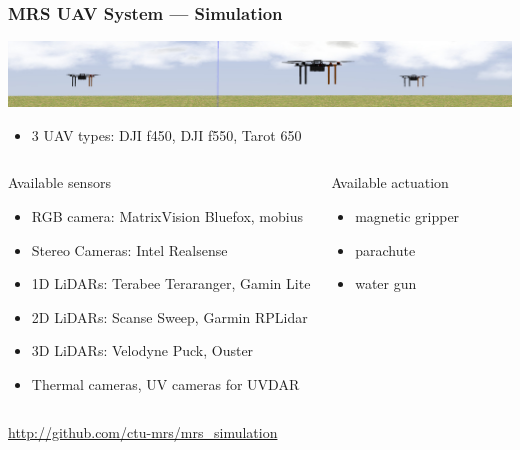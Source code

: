 \documentclass[aspectratio=1610]{beamer}
\begin{document}


  \begin{frame}
    \frametitle{MRS UAV System --- Simulation}

    \vspace{-0.33em}

    \includegraphics[width=1.0\textwidth]{./fig/thumbnail_simulation.jpg}

    \vspace{-0.3em}

    \begin{itemize}
      \item 3 UAV types: DJI f450, DJI f550, Tarot 650
    \end{itemize}

    \begin{columns}[c]


      \begin{block}{Available sensors}
        \begin{itemize}
          \item RGB camera: MatrixVision Bluefox, mobius
          \item Stereo Cameras: Intel Realsense
          \item 1D LiDARs: Terabee Teraranger, Gamin Lite
          \item 2D LiDARs: Scanse Sweep, Garmin RPLidar
          \item 3D LiDARs: Velodyne Puck, Ouster
          \item Thermal cameras, UV cameras for UVDAR
        \end{itemize}
      \end{block}


      \begin{block}{Available actuation}
        \begin{itemize}
          \item magnetic gripper
          \item parachute
          \item water gun
        \end{itemize}
      \end{block}

    \end{columns}

    \begin{block}{\cite{baca2020mrs}}
      \url{http://github.com/ctu-mrs/mrs_simulation}
    \end{block}

  \end{frame}
\end{document}
